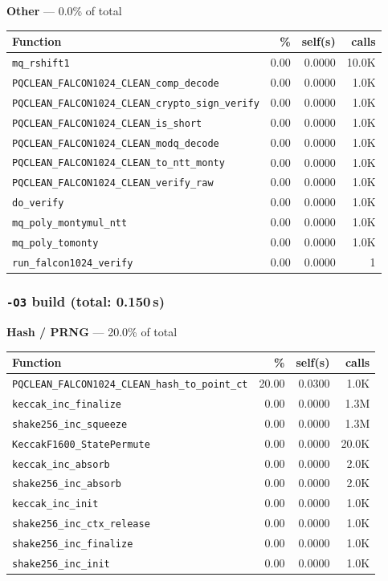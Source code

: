 \documentclass[11pt,a4paper]{article}
\begin{document}
\noindent\colorbox{othercolor}{\strut \textbf{Other} --- 0.0\% of total}
\vspace{2pt}

\begin{longtable}{p{7.5cm}rrr}
\toprule
Function & \% & self(s) & calls \\
\midrule
\endhead
  \texttt{mq\_rshift1} & 0.00 & 0.0000 & 10.0K \\
  \texttt{PQCLEAN\_FALCON1024\_CLEAN\_comp\_decode} & 0.00 & 0.0000 & 1.0K \\
  \texttt{PQCLEAN\_FALCON1024\_CLEAN\_crypto\_sign\_verify} & 0.00 & 0.0000 & 1.0K \\
  \texttt{PQCLEAN\_FALCON1024\_CLEAN\_is\_short} & 0.00 & 0.0000 & 1.0K \\
  \texttt{PQCLEAN\_FALCON1024\_CLEAN\_modq\_decode} & 0.00 & 0.0000 & 1.0K \\
  \texttt{PQCLEAN\_FALCON1024\_CLEAN\_to\_ntt\_monty} & 0.00 & 0.0000 & 1.0K \\
  \texttt{PQCLEAN\_FALCON1024\_CLEAN\_verify\_raw} & 0.00 & 0.0000 & 1.0K \\
  \texttt{do\_verify} & 0.00 & 0.0000 & 1.0K \\
  \texttt{mq\_poly\_montymul\_ntt} & 0.00 & 0.0000 & 1.0K \\
  \texttt{mq\_poly\_tomonty} & 0.00 & 0.0000 & 1.0K \\
  \texttt{run\_falcon1024\_verify} & 0.00 & 0.0000 & 1 \\
\bottomrule
\end{longtable}

\subsubsection*{\texttt{-O3} build (total: 0.150\,s)}

\noindent\colorbox{hashcolor}{\strut \textbf{Hash / PRNG} --- 20.0\% of total}
\vspace{2pt}

\begin{longtable}{p{7.5cm}rrr}
\toprule
Function & \% & self(s) & calls \\
\midrule
\endhead
  \texttt{PQCLEAN\_FALCON1024\_CLEAN\_hash\_to\_point\_ct} & 20.00 & 0.0300 & 1.0K \\
  \texttt{keccak\_inc\_finalize} & 0.00 & 0.0000 & 1.3M \\
  \texttt{shake256\_inc\_squeeze} & 0.00 & 0.0000 & 1.3M \\
  \texttt{KeccakF1600\_StatePermute} & 0.00 & 0.0000 & 20.0K \\
  \texttt{keccak\_inc\_absorb} & 0.00 & 0.0000 & 2.0K \\
  \texttt{shake256\_inc\_absorb} & 0.00 & 0.0000 & 2.0K \\
  \texttt{keccak\_inc\_init} & 0.00 & 0.0000 & 1.0K \\
  \texttt{shake256\_inc\_ctx\_release} & 0.00 & 0.0000 & 1.0K \\
  \texttt{shake256\_inc\_finalize} & 0.00 & 0.0000 & 1.0K \\
  \texttt{shake256\_inc\_init} & 0.00 & 0.0000 & 1.0K \\
\bottomrule
\end{longtable}
\end{document}
